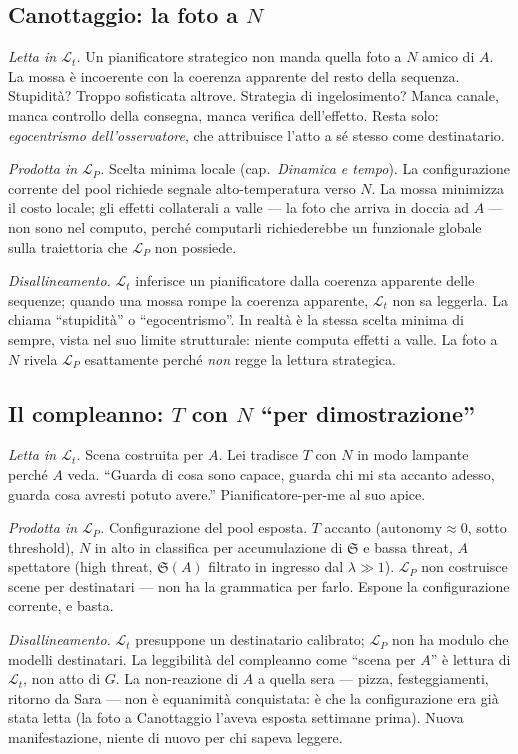 \documentclass[
    oneside,                 %
    openany,                 %
    titlepage,
    11pt,
    a4paper,
    italian,
    DIV=14,                  %
    headinclude,
    footinclude=true,
    cleardoublepage=empty
]{scrbook}
\theoremstyle{ctplain}
\theoremstyle{ctdef}
\theoremstyle{ctrem}
\newcommand{\Lt}{\mathcal{L}_t}
\newcommand{\LP}{\mathcal{L}_P}
\newcommand{\Sogno}{\mathfrak{S}}
\begin{document}
\subsection*{Canottaggio: la foto a $N$}

\emph{Letta in $\Lt$.} Un pianificatore strategico non manda quella foto a $N$ amico di $A$. La mossa è incoerente con la coerenza apparente del resto della sequenza. Stupidità? Troppo sofisticata altrove. Strategia di ingelosimento? Manca canale, manca controllo della consegna, manca verifica dell'effetto. Resta solo: \emph{egocentrismo dell'osservatore}, che attribuisce l'atto a sé stesso come destinatario.

\emph{Prodotta in $\LP$.} Scelta minima locale (cap.~\emph{Dinamica e tempo}). La configurazione corrente del pool richiede segnale alto-temperatura verso $N$. La mossa minimizza il costo locale; gli effetti collaterali a valle --- la foto che arriva in doccia ad $A$ --- non sono nel computo, perché computarli richiederebbe un funzionale globale sulla traiettoria che $\LP$ non possiede.

\emph{Disallineamento.} $\Lt$ inferisce un pianificatore dalla coerenza apparente delle sequenze; quando una mossa rompe la coerenza apparente, $\Lt$ non sa leggerla. La chiama ``stupidità'' o ``egocentrismo''. In realtà è la stessa scelta minima di sempre, vista nel suo limite strutturale: niente computa effetti a valle. La foto a $N$ rivela $\LP$ esattamente perché \emph{non} regge la lettura strategica.

\subsection*{Il compleanno: $T$ con $N$ ``per dimostrazione''}

\emph{Letta in $\Lt$.} Scena costruita per $A$. Lei tradisce $T$ con $N$ in modo lampante perché $A$ veda. ``Guarda di cosa sono capace, guarda chi mi sta accanto adesso, guarda cosa avresti potuto avere.'' Pianificatore-per-me al suo apice.

\emph{Prodotta in $\LP$.} Configurazione del pool esposta. $T$ accanto ($\mathrm{autonomy} \approx 0$, sotto threshold), $N$ in alto in classifica per accumulazione di $\Sogno$ e bassa threat, $A$ spettatore (high threat, $\Sogno(A)$ filtrato in ingresso dal $\lambda \gg 1$). $\LP$ non costruisce scene per destinatari --- non ha la grammatica per farlo. Espone la configurazione corrente, e basta.

\emph{Disallineamento.} $\Lt$ presuppone un destinatario calibrato; $\LP$ non ha modulo che modelli destinatari. La leggibilità del compleanno come ``scena per $A$'' è lettura di $\Lt$, non atto di $G$. La non-reazione di $A$ a quella sera --- pizza, festeggiamenti, ritorno da Sara --- non è equanimità conquistata: è che la configurazione era già stata letta (la foto a Canottaggio l'aveva esposta settimane prima). Nuova manifestazione, niente di nuovo per chi sapeva leggere.
\end{document}
